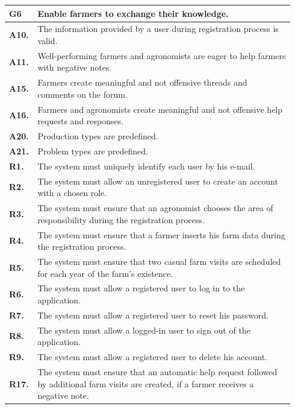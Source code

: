 \begin{longtable}{p{0.06\linewidth} p{0.88\linewidth}} 
    \toprule
    \textbf{G6} & Enable farmers to exchange their knowledge. \\ 
    \midrule
    \textbf{A10.} & The information provided by a user during registration process is valid.\\ 
    \textbf{A11.} & Well-performing farmers and agronomists are eager to help farmers with negative notes.\\ 
    \textbf{A15.} & Farmers create meaningful and not offensive threads and comments on the forum.\\ 
    \textbf{A16.} & Farmers and agronomists create meaningful and not offensive help requests and responses. \\
    \textbf{A20.} & Production types are predefined.\\
    \textbf{A21.} & Problem types are predefined.\\
    \midrule
    
	\textbf{R1.} & The system must uniquely identify each user by his e-mail. \\
	\textbf{R2.} & The system must allow an unregistered user to create an account with a chosen role. \\
	\textbf{R3.} & The system must ensure that an agronomist chooses the area of responsibility during the registration process. \\
	\textbf{R4.} & The system must ensure that a farmer inserts his farm data during the registration process.\\
	\textbf{R5.} & The system must ensure that two casual farm visits are scheduled for each year of the farm's existence.\\
	\textbf{R6.} & The system must allow a registered user to log in to the application. \\
	\textbf{R7.} & The system must allow a registered user to reset his password. \\
	\textbf{R8.} & The system must allow a logged-in user to sign out of the application. \\
	\textbf{R9.} & The system must allow a registered user to delete his account. \\
	
    \textbf{R17.} & The system must ensure that an automatic help request followed by additional farm visits are created, if a farmer receives a negative note.\\
	

\end{longtable}

